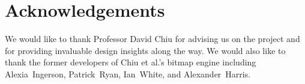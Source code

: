 \section{Acknowledgements}
We would like to thank Professor David Chiu for advising us on the project and
for providing invaluable design insights along the way. We would also like to
thank the former developers of Chiu et al.'s bitmap engine including
Alexia~Ingerson, Patrick~Ryan, Ian~White, and Alexander~Harris.
